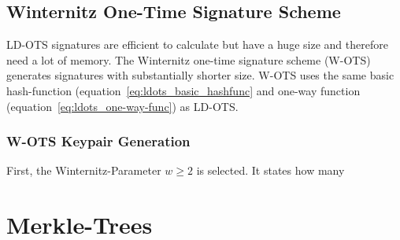 \subsection{Winternitz One-Time Signature Scheme}
LD-OTS signatures are efficient to calculate but have a huge size and therefore need a lot of memory. The Winternitz one-time signature scheme (W-OTS) generates signatures with substantially shorter size. W-OTS uses the same basic hash-function (equation~\ref{eq:ldots_basic_hashfunc} and one-way function (equation~\ref{eq:ldots_one-way-func}) as LD-OTS. %

\subsubsection{W-OTS Keypair Generation}
First, the Winternitz-Parameter $w \geq 2$ is selected. It states how many 


\section{Merkle-Trees}
